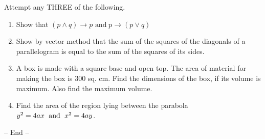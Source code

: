 \documentclass[14pt,a4paper]{extarticle}
\begin{document}
  
 Attempt any THREE of the following.  
\begin{enumerate}
\item Show that 
$(p \wedge q)\to p$ $ \text{and} \ $p$ \to(p \vee q)$  
\item Show by vector method that the sum of the squares of the diagonals of a parallelogram is equal to the sum of the squares of its sides.
\item A box is made with a square base and open top. The area of material for making the box is 300 sq. cm. Find the dimensions of the box, if its volume is maximum. Also find the maximum volume.
\item Find the area of the region lying between the parabola\quad$y^2 = 4ax \text{\; and \;} x^2=4ay$\;.
\end{enumerate}
\begin{center} -- End --   \end{center}
\end{document}
